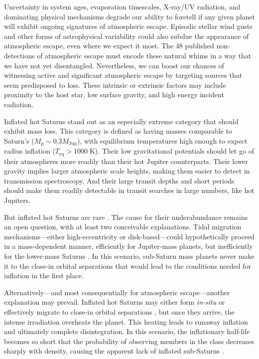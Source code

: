 \documentclass[twocolumn]{aastex631}
\begin{document}
Uncertainty in system ages, evaporation timescales, X-ray/UV radiation, and dominating physical mechanisms degrade our ability to foretell if any given planet will exhibit ongoing signatures of atmospheric escape.  Episodic stellar wind gusts and other forms of astrophysical variability could also subdue the appearance of atmospheric escape, even where we expect it most.  The 48 published non-detections of atmospheric escape \citep{2022arXiv221116243D} must encode these natural whims in a way that we have not yet disentangled. Nevertheless, we can boost our chances of witnessing active and significant atmospheric escape by targeting sources that seem predisposed to loss.  These intrinsic or extrinsic factors may include proximity to the host star, low surface gravity, and high energy incident radiation.

Inflated hot Saturns stand out as an especially extreme category that should exhibit mass loss.  This category is defined as having masses comparable to Saturn's ($M_p \sim 0.3 M_\mathrm{Jup}$), with equilibrium temperatures high enough to expect radius inflation ($T_\mathrm{eq}>1000\;$K).  Their low gravitational potentials should let go of their atmospheres more readily than their hot Jupiter counterparts.  Their lower gravity implies larger atmospheric scale heights, making them easier to detect in transmission spectroscopy.  And their large transit depths and short periods should make them readily detectable in transit searches in large numbers, like hot Jupiters.

But inflated hot Saturns are rare \citep{2018AJ....155..214T}.  The cause for their underabundance remains an open question, with at least two conceivable explanations.  Tidal migration mechanisms---either high-eccentricity or disk-based---could hypothetically proceed in a mass-dependent manner, efficiently for Jupiter-mass planets, but inefficiently for the lower-mass Saturns \citep{2018AJ....155..214T,2018ARA&A..56..175D}.  In this scenario, sub-Saturn mass planets never make it to the close-in orbital separations that would lead to the conditions needed for inflation in the first place.

Alternatively---and most consequentially for atmospheric escape---another explanation may prevail.  Inflated hot Saturns may either form \emph{in-situ} or effectively migrate to close-in orbital separations \citep{2018ARA&A..56..175D}, but once they arrive, the intense irradiation overheats the planet.  This heating leads to runaway inflation and ultimately complete disintegration.  In this scenario, the inflationary half-life becomes so short that the probability of observing members in the class decreases sharply with density, causing the apparent lack of inflated sub-Saturns \citep{2023ApJ...945L..36T}.
\end{document}
